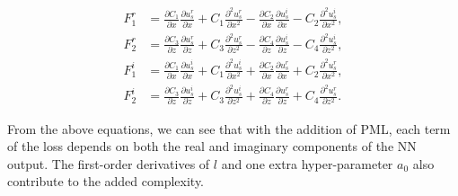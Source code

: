 \documentclass[authoryear, preprint, 12pt]{elsarticle}
\begin{document}
	\begin{equation}
	\begin{aligned}
		F_{1}^r &= \frac{\partial C_1}{\partial x} \frac{\partial u_s^r}{\partial x} 
		+ C_1 \frac{\partial^2 u_s^r}{\partial x^2}
		- \frac{\partial C_2}{\partial x} \frac{\partial u_s^i}{\partial x}
		- C_2 \frac{\partial^2 u_s^i}{\partial x^2}, \\
		F_{2}^r &= \frac{\partial C_3}{\partial z} \frac{\partial u_s^r}{\partial z} 
		+ C_3 \frac{\partial^2 u_s^r}{\partial z^2}
		- \frac{\partial C_4}{\partial z} \frac{\partial u_s^i}{\partial z}
		- C_4 \frac{\partial^2 u_s^i}{\partial z^2}, \\
		F_{1}^i &= \frac{\partial C_1}{\partial x} \frac{\partial u_s^i}{\partial x} 
		+ C_1 \frac{\partial^2 u_s^i}{\partial x^2}
		+ \frac{\partial C_2}{\partial x} \frac{\partial u_s^r}{\partial x}
		+ C_2 \frac{\partial^2 u_s^r}{\partial x^2}, \\
		F_{2} ^i &= \frac{\partial C_3}{\partial z} \frac{\partial u_s^i}{\partial z} 
		+ C_3 \frac{\partial^2 u_s^i}{\partial z^2}
		+ \frac{\partial C_4}{\partial z} \frac{\partial u_s^r}{\partial z}
		+ C_4 \frac{\partial^2 u_s^r}{\partial z^2}.
	\end{aligned}
\end{equation}

	From the above equations, we can see that with the addition of PML, each term of the loss depends on both the real and imaginary components of the NN output. The first-order derivatives of $l$ and one extra hyper-parameter $a_0$ also contribute to the added complexity.   

%


\end{document}
